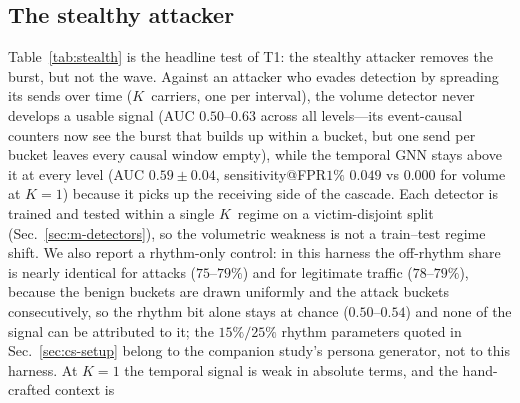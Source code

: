 \subsection{The stealthy attacker}
\label{sec:res-stealth}
Table~\ref{tab:stealth} is the headline test of T1: the stealthy attacker removes the burst, but not the wave.
Against an attacker who evades detection by spreading its sends over time ($K$~carriers, one per interval),
the volume detector never develops a usable signal (AUC $0.50$--$0.63$ across all levels---its event-causal
counters now see the burst that builds up within a bucket, but one send per bucket leaves every causal
window empty), while the temporal GNN stays above it
at every level (AUC $0.59{\pm}0.04$, sensitivity@FPR$1\%$ $0.049$ vs $0.000$ for volume at $K{=}1$) because it
picks up the receiving side of the cascade.
Each detector is trained and tested within a single $K$~regime on a victim-disjoint split (Sec.~\ref{sec:m-detectors}),
so the volumetric weakness is not a train--test regime shift. We also report a rhythm-only control: in this
harness the off-rhythm share is nearly identical for attacks ($75$--$79\%$) and for legitimate traffic
($78$--$79\%$), because the benign buckets are drawn uniformly and the attack buckets consecutively, so the
rhythm bit alone stays at chance ($0.50$--$0.54$) and none of the signal can be attributed to it; the
$15\%/25\%$ rhythm parameters quoted in Sec.~\ref{sec:cs-setup} belong to the companion study's persona
generator, not to this harness. At $K{=}1$ the temporal signal is weak in absolute terms, and the hand-crafted context is
